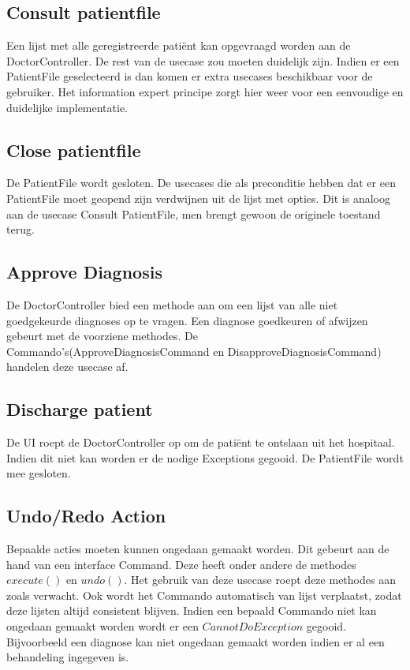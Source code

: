 \subsection{Consult patientfile}
Een lijst met alle geregistreerde patiënt kan opgevraagd worden aan de DoctorController. De rest van de usecase zou moeten duidelijk zijn.
Indien er een PatientFile geselecteerd is dan komen er extra usecases beschikbaar voor de gebruiker.
Het information expert principe zorgt hier weer voor een eenvoudige en duidelijke implementatie.

\subsection{Close patientfile}
De PatientFile wordt gesloten. De usecases die als preconditie hebben dat er een PatientFile moet geopend zijn verdwijnen uit de lijst met opties. 
Dit is analoog aan de usecase Consult PatientFile, men brengt gewoon de originele toestand terug.

\subsection{Approve Diagnosis}
De DoctorController bied een methode aan om een lijst van alle niet goedgekeurde diagnoses op te vragen. 
Een diagnose goedkeuren of afwijzen gebeurt met de voorziene methodes. 
De Commando's(ApproveDiagnosisCommand en DisapproveDiagnosisCommand) handelen deze usecase af. 

\subsection{Discharge patient}
De UI roept de DoctorController op om de patiënt te ontslaan uit het hospitaal. Indien dit niet kan worden er de nodige Exceptions gegooid.
De PatientFile wordt mee gesloten.

\subsection{Undo/Redo Action}
Bepaalde acties moeten kunnen ongedaan gemaakt worden. Dit gebeurt aan de hand van een interface Command. 
Deze heeft onder andere de methodes $execute()$ en $undo()$. 
Het gebruik van deze usecase roept deze methodes aan zoals verwacht. 
Ook wordt het Commando automatisch van lijst verplaatst, zodat deze lijsten altijd consistent blijven.
Indien een bepaald Commando niet kan ongedaan gemaakt worden wordt er een $CannotDoException$ gegooid. 
Bijvoorbeeld een diagnose kan niet ongedaan gemaakt worden indien er al een behandeling ingegeven is.

